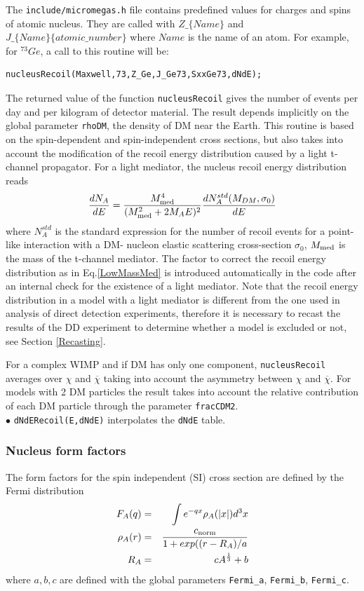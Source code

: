 \documentclass[12pt,a4paper]{article}
\begin{document}
 The \verb|include/micromegas.h| file contains  predefined values for charges
and spins of atomic nucleus. They are called with $Z\_\{Name\}$ and $J\_\{Name\}\{atomic\_number\}$ where
$Name$ is the name of an atom.   For example, for $^{73}Ge$, a call to this routine will be: 
\begin{verbatim}
nucleusRecoil(Maxwell,73,Z_Ge,J_Ge73,SxxGe73,dNdE);
\end{verbatim}

The returned value of the function {\tt nucleusRecoil} gives the number of events per day and per kilogram of 
detector material. The  result depends  implicitly on the  global  parameter \verb|rhoDM|, the
density of DM near the Earth.
This routine is  based on the spin-dependent and spin-independent cross sections, but also
takes into account the modification of the recoil energy distribution caused  by a  light t- channel propagator.
For a light mediator, the nucleus recoil energy distribution  reads
\begin{equation}
\label{LowMassMed}
\frac{dN_{A}}{dE} = \frac{ M_{\rm med}^4}{(M_{\rm med}^2 +2 M_{A} E)^2}
\frac{dN_{A}^{std}(M_{DM},\sigma_0)}{dE} 
\end{equation}
where $N_{A}^{std}$ is the standard expression for the number of recoil events for a point-like interaction with a DM- nucleon elastic scattering cross-section $\sigma_0$, $M_{\rm med}$ is the mass of the t-channel mediator. The factor to correct the  recoil energy distribution as in Eq.\ref{LowMassMed}  is introduced automatically in the code after an internal check for  the existence of a light
mediator. {Note that the recoil energy distribution in a model with a light mediator  is different from the one used in analysis of  direct detection experiments, therefore it is necessary to recast  the results of the DD experiment to determine whether a  model is excluded or not, see Section  \ref{Recasting}.    }

For a complex WIMP and if DM has only one
component, \verb|nucleusRecoil| averages over $\chi$ and
$\overline{\chi}$ taking into account  the asymmetry between $\chi$ and $\overline{\chi}$. For models with 2 DM particles  the result takes into  account the relative contribution of each DM particle through the
parameter {\tt fracCDM2}.\\



\noindent $\bullet$ \verb|dNdERecoil(E,dNdE)| interpolates the {\tt dNdE} table.

\subsubsection{Nucleus form factors}
\label{Nucleus_form_factors}
The form factors for the spin independent (SI) cross section are defined by the Fermi distribution
\begin{eqnarray}
F_A(q)&=&\int e^{-qx}\rho_A(|x|)d^3x\\
\rho_A(r)&=&\frac{c_{\rm{norm}}}{ 1+ exp((r-R_A)/a}\\
R_A&=& c A^{\frac{1}{3}} +b
\end{eqnarray}
where $a,b,c$ are defined with  the global parameters \verb|Fermi_a|, \verb|Fermi_b|,
\verb|Fermi_c|. 
\end{document}
